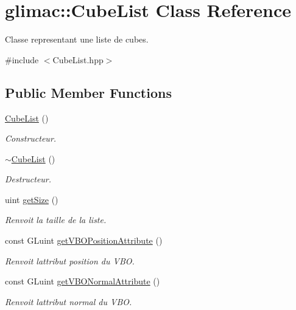 \hypertarget{classglimac_1_1CubeList}{}\section{glimac\+:\+:Cube\+List Class Reference}
\label{classglimac_1_1CubeList}


Classe representant une liste de cubes.  




{\ttfamily \#include $<$Cube\+List.\+hpp$>$}

\subsection*{Public Member Functions}
\begin{DoxyCompactItemize}
\item 
\hyperlink{classglimac_1_1CubeList_a27f9622967bd19bcb34b3095fbb55ff6}{Cube\+List} ()
\begin{DoxyCompactList}\small\item\em Constructeur. \end{DoxyCompactList}\item 
\hyperlink{classglimac_1_1CubeList_aca9014a89b4f853e301a2821b6d881d9}{$\sim$\+Cube\+List} ()
\begin{DoxyCompactList}\small\item\em Destructeur. \end{DoxyCompactList}\item 
uint \hyperlink{classglimac_1_1CubeList_a22bdb56a8ad725631572e517234ac775}{get\+Size} ()
\begin{DoxyCompactList}\small\item\em Renvoit la taille de la liste. \end{DoxyCompactList}\item 
const G\+Luint \hyperlink{classglimac_1_1CubeList_a849ccb890002bf4c1f0692741219e076}{get\+V\+B\+O\+Position\+Attribute} ()
\begin{DoxyCompactList}\small\item\em Renvoit l\textquotesingle{}attribut position du V\+BO. \end{DoxyCompactList}\item 
const G\+Luint \hyperlink{classglimac_1_1CubeList_a540ce314986990e41f51dfeafdb5fede}{get\+V\+B\+O\+Normal\+Attribute} ()
\begin{DoxyCompactList}\small\item\em Renvoit l\textquotesingle{}attribut normal du V\+BO. \end{DoxyCompactList}\item 

\end{DoxyCompactItemize}
